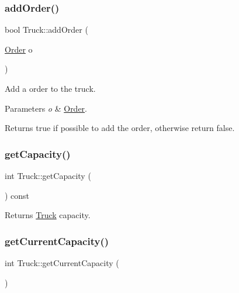 \subsubsection{\texorpdfstring{add\+Order()}{addOrder()}}
{\footnotesize\ttfamily bool Truck\+::add\+Order (\begin{DoxyParamCaption}\item[{\hyperlink{class_order}{Order}}]{o }\end{DoxyParamCaption})}



Add a order to the truck. 


\begin{DoxyParams}{Parameters}
{\em o} & \hyperlink{class_order}{Order}.\\
\hline
\end{DoxyParams}
\begin{DoxyReturn}{Returns}
true if possible to add the order, otherwise return false. 
\end{DoxyReturn}
\mbox{\label{class_truck_a412e4de460eda1dc2100ecc1e47fb368}} 
\subsubsection{\texorpdfstring{get\+Capacity()}{getCapacity()}}
{\footnotesize\ttfamily int Truck\+::get\+Capacity (\begin{DoxyParamCaption}{ }\end{DoxyParamCaption}) const}

\begin{DoxyReturn}{Returns}
\hyperlink{class_truck}{Truck} capacity. 
\end{DoxyReturn}
\mbox{\label{class_truck_a97ab69fced09f49cf05cf50712e15342}} 
\subsubsection{\texorpdfstring{get\+Current\+Capacity()}{getCurrentCapacity()}}
{\footnotesize\ttfamily int Truck\+::get\+Current\+Capacity (\begin{DoxyParamCaption}{ }\end{DoxyParamCaption})}


